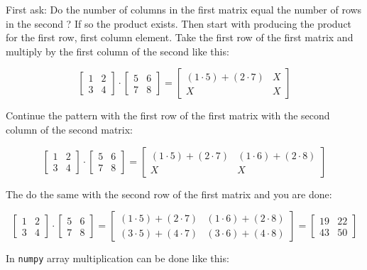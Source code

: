 \documentclass[11pt]{article}
\begin{document}
First ask: Do the number of columns in the first matrix equal the number
of rows in the second ? If so the product exists. Then start with
producing the product for the first row, first column element. Take the
first row of the first matrix and multiply by the first column of the
second like this:

\[ 
\begin{bmatrix}
1 & 2 \\
3 & 4
\end{bmatrix}
\cdot
\begin{bmatrix}
5 & 6 \\
7 & 8
\end{bmatrix}
=
\begin{bmatrix}
(1\cdot 5) + (2\cdot 7) & X \\
X & X
\end{bmatrix}
\]

Continue the pattern with the first row of the first matrix with the
second column of the second matrix:

\[ 
\begin{bmatrix}
1 & 2 \\
3 & 4
\end{bmatrix}
\cdot
\begin{bmatrix}
5 & 6 \\
7 & 8
\end{bmatrix}
=
\begin{bmatrix}
(1\cdot 5) + (2\cdot 7) & (1\cdot 6) + (2\cdot 8)  \\
X & X
\end{bmatrix}
\]

The do the same with the second row of the first matrix and you are
done:

\[ 
\begin{bmatrix}
1 & 2 \\
3 & 4
\end{bmatrix}
\cdot
\begin{bmatrix}
5 & 6 \\
7 & 8
\end{bmatrix}
=
\begin{bmatrix}
(1\cdot 5) + (2\cdot 7) & (1\cdot 6) + (2\cdot 8)  \\
(3\cdot 5) + (4\cdot 7) & (3\cdot 6) + (4\cdot 8) 
\end{bmatrix}
=
\begin{bmatrix}
19 & 22 \\
43 & 50 
\end{bmatrix}
\]

In \texttt{numpy} array multiplication can be done like this:
\end{document}
